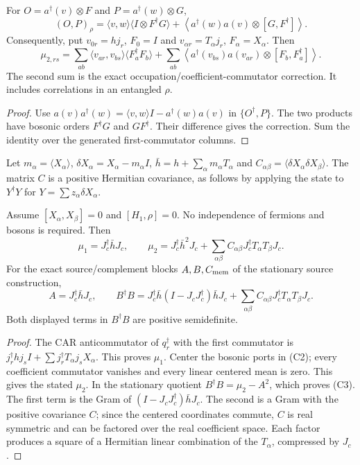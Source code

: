 \documentclass[12pt,a4paper]{article}
\begin{document}
\begin{proposition}
\label{p4:prop:v2168-coefficient-pairing}
For $O=a^\dagger(v)\otimes F$ and $P=a^\dagger(w)\otimes G$,
\[
 \boxed{
 (O,P)_\rho
 =\langle v,w\rangle\langle I\otimes F^\dagger G\rangle
  +\left\langle a^\dagger(w)a(v)\otimes[G,F^\dagger]\right\rangle.}
\]
Consequently, put $v_{0r}=hj_r$, $F_0=I$ and
$v_{\alpha r}=T_\alpha j_r$, $F_\alpha=X_\alpha$. Then
\[
 \boxed{
 \mu_{2,rs}=\sum_{ab}\langle v_{ar},v_{bs}\rangle
                         \langle F_a^\dagger F_b\rangle
 +\sum_{ab}\left\langle a^\dagger(v_{bs})a(v_{ar})
                         \otimes[F_b,F_a^\dagger]\right\rangle.}
 \tag{C2}
\]
The second sum is the exact occupation/coefficient-commutator correction.
It includes correlations in an entangled $\rho$.
\end{proposition}
\begin{proof}
Use $a(v)a^\dagger(w)=\langle v,w\rangle I-a^\dagger(w)a(v)$ in
$\{O^\dagger,P\}$. The two products have bosonic orders $F^\dagger G$
and $GF^\dagger$. Their difference gives the correction. Sum the
identity over the generated first-commutator columns.
\end{proof}

Let $m_\alpha=\langle X_\alpha\rangle$,
$\delta X_\alpha=X_\alpha-m_\alpha I$,
$\bar h=h+\sum_\alpha m_\alpha T_\alpha$ and
$C_{\alpha\beta}=\langle\delta X_\alpha\delta X_\beta\rangle$.
The matrix $C$ is a positive Hermitian covariance, as follows by applying
the state to $Y^\dagger Y$ for $Y=\sum z_\alpha\delta X_\alpha$.

\begin{theorem}
\label{p4:thm:v2168-commuting-port-memory-gram}
Assume $[X_\alpha,X_\beta]=0$ and $[H_1,\rho]=0$. No independence of
fermions and bosons is required. Then
\[
 \boxed{\mu_1=J_c^\dagger\bar hJ_c,\qquad
 \mu_2=J_c^\dagger\bar h^2J_c
       +\sum_{\alpha\beta}C_{\alpha\beta}
                   J_c^\dagger T_\alpha T_\beta J_c.}
\]
For the exact source/complement blocks $A,B,C_{\rm mem}$ of the stationary source construction,
\[
 \boxed{
 A=J_c^\dagger\bar hJ_c,\qquad
 B^\dagger B
 =J_c^\dagger\bar h(I-J_cJ_c^\dagger)\bar hJ_c
  +\sum_{\alpha\beta}C_{\alpha\beta}
                   J_c^\dagger T_\alpha T_\beta J_c.}
 \tag{C3}
\]
Both displayed terms in $B^\dagger B$ are positive semidefinite.
\end{theorem}
\begin{proof}
The CAR anticommutator of $q_r^\dagger$ with the first commutator is
$j_r^\dagger hj_sI+\sum j_r^\dagger T_\alpha j_sX_\alpha$.
This proves $\mu_1$. Center the bosonic ports in (C2); every coefficient
commutator vanishes and every linear centered mean is zero. This gives
the stated $\mu_2$. In the stationary quotient
$B^\dagger B=\mu_2-A^2$, which proves (C3). The first term is
the Gram of $(I-J_cJ_c^\dagger)\bar hJ_c$.
The second is a Gram with the positive covariance $C$; since the centered
coordinates commute, $C$ is real symmetric and can be factored over the
real coefficient space. Each factor produces a square of a Hermitian
linear combination of the $T_\alpha$, compressed by $J_c$.
\end{proof}
\end{document}
